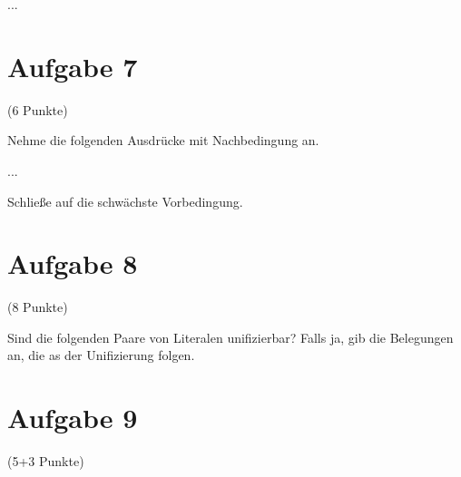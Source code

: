 \documentclass{exam}
\newcommand{\Punkte}[1]{\begin{flushright}(#1 Punkte)\end{flushright}}
\begin{document}
	...
	
	
	\clearpage
	\section{Aufgabe 7}
	\Punkte{6}
	
	
	Nehme die folgenden Ausdrücke mit Nachbedingung an.
	
	...
	
	Schließe auf die schwächste Vorbedingung.
	
	
	\clearpage
	\section{Aufgabe 8}
	\Punkte{8}
	
	Sind die folgenden Paare von Literalen unifizierbar? Falls ja, gib die  Belegungen an, die as der Unifizierung folgen.
	
	
	
	\clearpage
	\section{Aufgabe 9}
	\Punkte{5+3}
	
\end{document}
